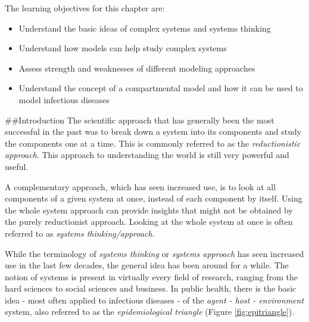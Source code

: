 \documentclass[]{book}
\providecommand{\tightlist}{%
  \setlength{\itemsep}{0pt}\setlength{\parskip}{0pt}}
\theoremstyle{definition}
\theoremstyle{definition}
\theoremstyle{definition}
\theoremstyle{remark}
\begin{document}
The learning objectives for this chapter are:

\begin{itemize}
\tightlist
\item
  Understand the basic ideas of complex systems and systems thinking
\item
  Understand how models can help study complex systems
\item
  Assess strength and weaknesses of different modeling approaches
\item
  Understand the concept of a compartmental model and how it can be used
  to model infectious diseases
\end{itemize}

\#\#Introduction The scientific approach that has generally been the
most successful in the past was to break down a system into its
components and study the components one at a time. This is commonly
referred to as the \emph{reductionistic approach}. This approach to
understanding the world is still very powerful and useful.

A complementary approach, which has seen increased use, is to look at
all components of a given system at once, instead of each component by
itself. Using the whole system approach can provide insights that might
not be obtained by the purely reductionist approach. Looking at the
whole system at once is often referred to as \emph{systems
thinking/approach}.

While the terminology of \emph{systems thinking} or \emph{systems
approach} has seen increased use in the last few decades, the general
idea has been around for a while. The notion of systems is present in
virtually every field of research, ranging from the hard sciences to
social sciences and business. In public health, there is the basic idea
- most often applied to infectious diseases - of the \emph{agent - host
- environment} system, also referred to as the \emph{epidemiological
triangle} (Figure \ref{fig:epitriangle}).
\end{document}
